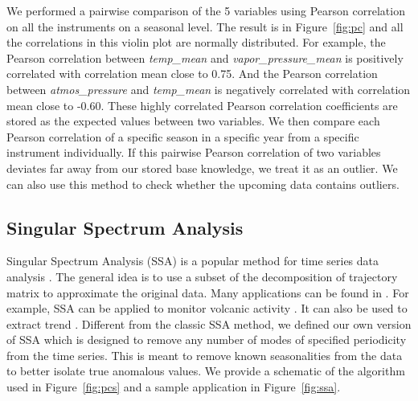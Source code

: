 \documentclass[letterpaper, 10 pt, conference]{ieeeconf}  %
\begin{document}
We performed a pairwise comparison of the 5 variables using Pearson correlation on all the instruments on a seasonal level. The result is in Figure~\ref{fig:pc} and all the correlations in this violin plot are normally distributed. For example, the Pearson correlation between \textit{temp\_mean} and \textit{vapor\_pressure\_mean} is positively correlated with correlation mean close to 0.75. And the Pearson correlation between \textit{atmos\_pressure} and \textit{temp\_mean} is negatively correlated with correlation mean close to -0.60. These highly correlated Pearson correlation coefficients are stored as the expected values between two variables. We then compare each Pearson correlation of a specific season in a specific year from a specific instrument individually. If this pairwise Pearson correlation of two variables deviates far away from our stored base knowledge, we treat it as an outlier. We can also use this method to check whether the upcoming data contains outliers.

\subsection{Singular Spectrum Analysis}
Singular Spectrum Analysis (SSA) is a popular method for time series data analysis \cite{golyandina2013singular, golyandina2014basic}. The general idea is to use a subset of the decomposition of trajectory matrix to approximate the original data. Many applications can be found in \cite{golyandina2013singular}. For example, SSA can be applied to monitor volcanic activity \cite{bozzo2010relationship}. It can also be used to extract trend \cite{alexandrov2008method}. Different from the classic SSA method, we defined our own version of SSA which is designed to remove any number of modes of specified periodicity from the time series. This is meant to remove known seasonalities from the data to better isolate true anomalous values. We provide a schematic of the algorithm used in Figure~\ref{fig:pcs} and a sample application in Figure~\ref{fig:ssa}.
\end{document}
